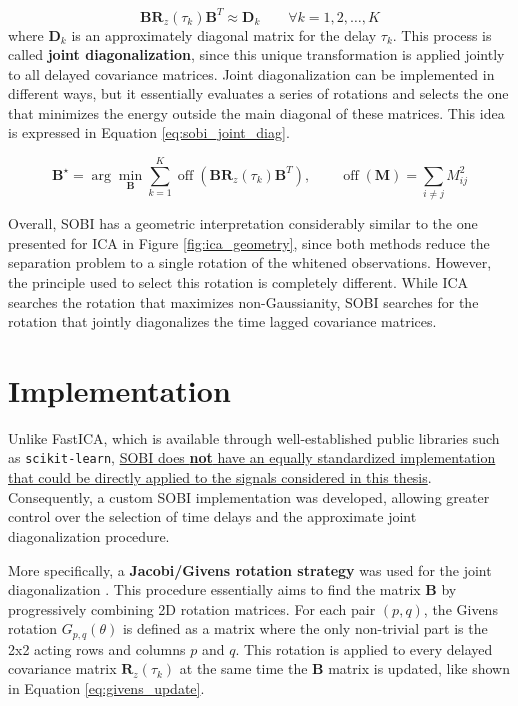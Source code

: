 \begin{equation}
    \mathbf{B}\mathbf{R}_z(\tau_k)\mathbf{B}^T \approx \mathbf{D}_k \qquad \forall k=1,2,\dots,K
\end{equation}
where $\mathbf{D}_k$ is an approximately diagonal matrix for the delay $\tau_k$. This process is called \textbf{joint diagonalization}, since this unique transformation is applied jointly to all delayed covariance matrices. Joint diagonalization can be implemented in different ways, but
it essentially evaluates a series of rotations and selects the one that minimizes the energy outside the main diagonal of these matrices. This idea is expressed in Equation \ref{eq:sobi_joint_diag}.

\begin{equation}
\mathbf{B}^{\star}
    =
    \arg\min_{\mathbf{B}}
    \sum_{k=1}^{K}
    \operatorname{off}
    \left(
    \mathbf{B}\mathbf{R}_z(\tau_k)\mathbf{B}^T
    \right), \qquad 
    \operatorname{off}(\mathbf{M})
    =
    \sum_{i \neq j} M_{ij}^{2}
    \label{eq:sobi_joint_diag}
\end{equation}

Overall, SOBI has a geometric interpretation considerably similar to the one presented for ICA in Figure \ref{fig:ica_geometry}, since both methods reduce the separation problem to a single rotation of the whitened observations. However, the principle used to select this rotation is completely different. While ICA searches the rotation that maximizes non-Gaussianity, SOBI searches for the rotation that jointly diagonalizes the time lagged covariance matrices.

\section{Implementation}
Unlike FastICA, which is available through well-established public libraries such as \texttt{scikit-learn}, \uline{SOBI does \textbf{not} have an equally standardized implementation that could be directly applied to the signals considered in this thesis}. Consequently, a custom SOBI implementation was developed, allowing greater control over the selection of time delays and the approximate joint diagonalization procedure. 

More specifically, a \textbf{Jacobi/Givens rotation strategy} was used for the joint diagonalization \cite{fevotte_pivot_nodate,van_der_veen_joint_2001}. This procedure essentially aims to find the matrix $\mathbf{B}$ by progressively combining 2D rotation matrices. For each pair $(p,q)$, the Givens rotation $G_{p,q}(\theta)$ is defined as a matrix where the only non-trivial part is the 2x2 acting rows and columns $p$ and $q$. This rotation is applied to every delayed covariance matrix $\mathbf{R}_z(\tau_k)$ at the same time the $\mathbf{B}$ matrix is updated, like shown in Equation \ref{eq:givens_update}.

